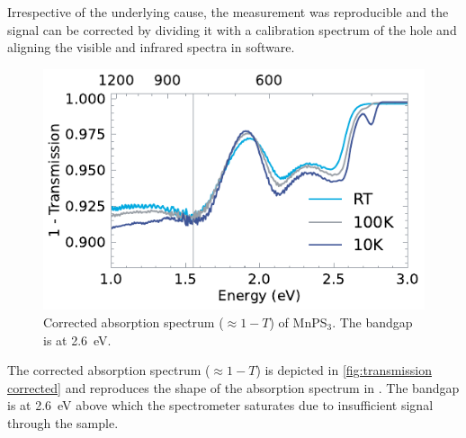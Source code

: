 \documentclass[
	oneside,
	parskip=half,
	a4paper,
]{scrbook}
\begin{document}
Irrespective of the underlying cause, the measurement was reproducible and the signal can be corrected by dividing it with a calibration spectrum of the hole and aligning the visible and infrared spectra in software.

\begin{figure}
	\centering
	\includegraphics{../figures/2024-03-15 MnPS3 transmission processed.pdf }
	\caption{Corrected absorption spectrum ($\approx 1- T$) of MnPS$_3$. The bandgap is at \SI{2.6}{eV}.}
	\label{fig:transmission corrected}
\end{figure}
The corrected absorption spectrum ($\approx 1 - T$) is depicted in \autoref{fig:transmission corrected} and reproduces the shape of the absorption spectrum in \cite{MnPS3_transmission}.
The bandgap is at \SI{2.6}{eV} above which the spectrometer saturates due to insufficient signal through the sample.
\end{document}

